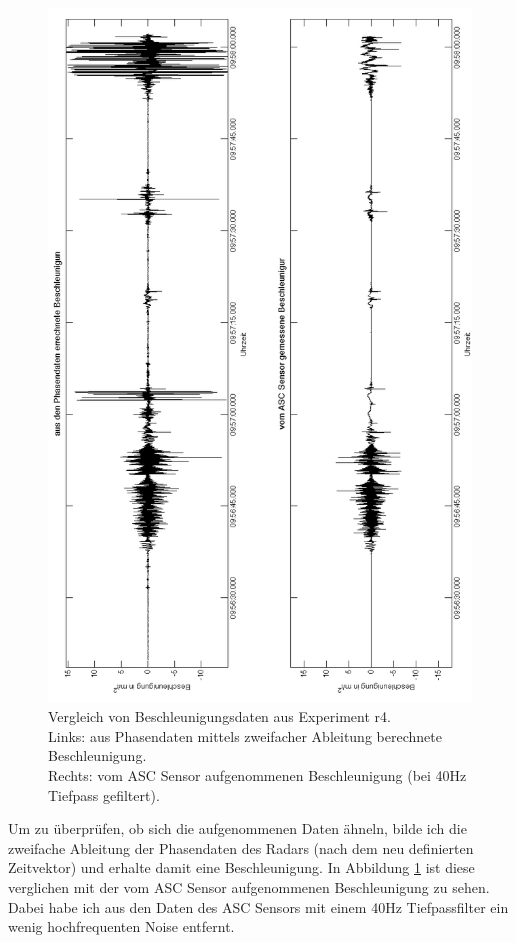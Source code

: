 \documentclass[12pt,a4paper,twoside,BCOR=12.5mm]{scrartcl}
\begin{document}
\begin{figure}[htb]
\centering

\includegraphics[scale=.4]{geoauswertung/a_vs_z.png}
\caption{Vergleich von Beschleunigungsdaten aus Experiment r4. \\Links: aus Phasendaten mittels zweifacher Ableitung berechnete Beschleunigung. \\Rechts: vom ASC Sensor aufgenommenen Beschleunigung (bei 40Hz Tiefpass gefiltert).}
\label{a_vs_z}
\end{figure}

Um zu überprüfen, ob sich die aufgenommenen Daten ähneln, bilde ich die zweifache Ableitung der Phasendaten des Radars (nach dem neu definierten Zeitvektor) und erhalte damit eine Beschleunigung. In Abbildung \ref{a_vs_z} ist diese verglichen mit der vom ASC Sensor aufgenommenen Beschleunigung zu sehen. Dabei habe ich aus den Daten des ASC Sensors mit einem 40Hz Tiefpassfilter ein wenig hochfrequenten Noise entfernt.
\end{document}
